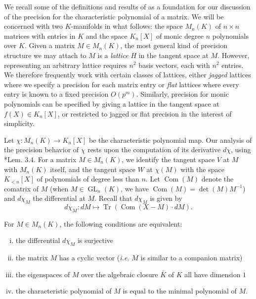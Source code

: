 \documentclass{sig-alternate-05-2015}
\DeclareMathOperator{\GL}{GL}
\DeclareMathOperator{\tr}{Tr}
\DeclareMathOperator{\com}{Com}
\begin{document}
We recall some of the definitions and results of \cite{caruso-roe-vaccon:14a}
as a foundation for our discussion of the precision for the characteristic polynomial
of a matrix.  We will be concerned with two $K$-manifolds in what follows:
the space $M_n(K)$ of $n \times n$ matrices with entries in $K$ and the space
$K_n[X]$ of monic degree $n$ polynomials over $K$.  Given a matrix $M \in M_n(K)$,
the most general kind of precision structure we may attach to $M$ is a
\emph{lattice} $H$ in the tangent space at $M$.  However, representing an
arbitrary lattice requires $n^2$ basis vectors, each with $n^2$ entries.  We therefore
frequently work with certain classes of lattices, either \emph{jagged} lattices
where we specify a precision for each matrix entry or \emph{flat} lattices where
every entry is known to a fixed precision $O(p^m)$.  Similarly, precision for
monic polynomials can be specified by giving a lattice in the tangent space
at $f(X) \in K_n[X]$, or restricted to jagged or flat precision in the interest
of simplicity.

Let $\chi : M_n(K) \to K_n[X]$ be the characteristic polynomial map.
Our analysis of the precision behavior of $\chi$ rests upon
the computation of its derivative $d\chi$, using \cite{caruso-roe-vaccon:14a}*{Lem. 3.4}.
For a matrix $M \in M_n(K)$, we identify the tangent space $V$
at $M$ with $M_n(K)$ itself, and the tangent space $W$ at $\chi(M)$ with
the space $K_{<n}[X]$ of polynomials of degree less than $n$.
Let $\com(M)$ denote the comatrix of $M$ (when $M \in \GL_n(K)$,
we have $\com(M) = \det(M) M^{-1}$) and $d\chi_M$ the differential at $M$.  Recall
that $d\chi_M$ is given by
\begin{equation} \label{eq:dchi}
d\chi_M: dM \mapsto \tr(\com(X-M) \cdot dM).
\end{equation}

\begin{prop}
\label{prop:surjectivity}
For $M \in M_n(K)$, the following conditions are equivalent:
\begin{enumerate}[(i)]
\renewcommand{\itemsep}{0pt}
\item \label{pt:surj} the differential $d\chi_M$ is surjective
\item \label{pt:cyc} the matrix $M$ has a cyclic vector (\emph{i.e.} $M$ is similar
to a companion matrix)
\item \label{pt:1d} the eigenspaces of $M$ over the algebraic
closure $\bar{K}$ of $K$ all have dimension $1$
\item \label{pt:charmin} the characteristic polynomial of $M$ is equal to the minimal polynomial of $M$.
\end{enumerate}
\end{prop}
\end{document}
